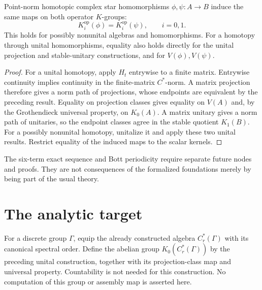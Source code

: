 \begin{proposition}\label{prop:operator-k-homotopy-invariance}
Point-norm homotopic complex star homomorphisms $\phi,\psi:A\to B$ induce
the same maps on both operator $K$-groups:
\[
 K_i^{\mathrm{op}}(\phi)=K_i^{\mathrm{op}}(\psi),\qquad i=0,1.
\]
This holds for possibly nonunital algebras and homomorphisms. For a homotopy
through unital homomorphisms, equality also holds directly for the unital
projection and stable-unitary constructions, and for $V(\phi),V(\psi)$.
\end{proposition}
\begin{proof}
\leanok
For a unital homotopy, apply $H_t$ entrywise to a finite matrix.
Entrywise continuity implies continuity in the finite-matrix $C^*$-norm.
A matrix projection therefore gives a norm path of projections, whose
endpoints are equivalent by the preceding result. Equality on projection
classes gives equality on $V(A)$ and, by the Grothendieck universal property,
on $K_0(A)$. A matrix unitary gives a norm path of unitaries, so the endpoint
classes agree in the stable quotient $K_1(B)$.
For a possibly nonunital homotopy, unitalize it and apply these two unital
results. Restrict equality of the induced maps to the scalar kernels.
\end{proof}

The six-term exact sequence and Bott periodicity require separate future
nodes and proofs. They are not consequences of the formalized foundations
merely by being part of the usual theory.

\section{The analytic target}

\begin{definition}\label{def:analytic-k0}
\leanok
For a discrete group $\Gamma$, equip the already constructed algebra
$C_r^*(\Gamma)$ with its canonical spectral order. Define the abelian group
$K_0(C_r^*(\Gamma))$ by the preceding unital construction, together with
its projection-class map and universal property. Countability is not needed
for this construction. No computation of this group or assembly map is
asserted here.
\end{definition}



